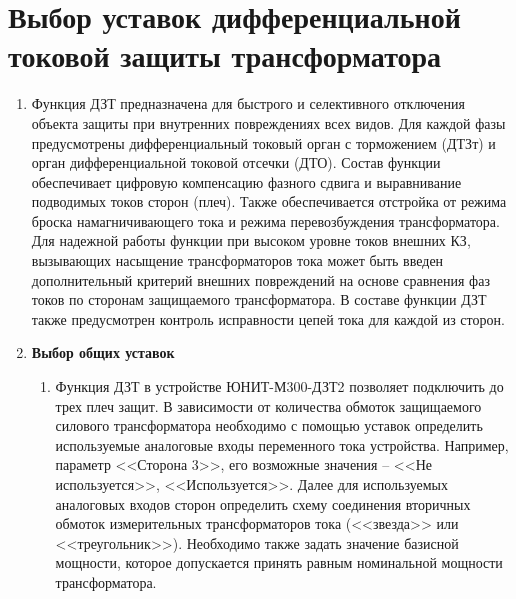 \color{uniblue}\section[Выбор уставок дифференциальной токовой защиты трансформатора]{\sloppy Выбор уставок дифференциальной токовой защиты \mbox{трансформатора}} 
\color{black}

\begin{enumerate}[label=\arabic{section}.\arabic{enumi}, labelsep=7pt, leftmargin=0pt, itemindent=60pt, align=left, nosep]
\item
Функция ДЗТ предназначена для быстрого и селективного отключения объекта защиты при внутренних повреждениях всех видов. Для каждой фазы предусмотрены дифференциальный токовый орган с торможением (ДТЗт) и орган дифференциальной токовой отсечки (ДТО). Состав функции обеспечивает цифровую компенсацию фазного сдвига и выравнивание подводимых токов сторон (плеч). Также обеспечивается отстройка от режима броска намагничивающего тока и режима перевозбуждения трансформатора. Для надежной работы функции при высоком уровне токов внешних КЗ, вызывающих насыщение трансформаторов тока может быть введен дополнительный критерий внешних повреждений на основе сравнения фаз токов по сторонам защищаемого трансформатора. В составе функции ДЗТ также предусмотрен контроль исправности цепей тока для каждой из сторон.

\item \textbf{Выбор общих уставок}

\begin{enumerate}[label=\arabic{section}.\arabic{enumi}.\arabic*, labelsep=7pt, leftmargin=0em, itemindent=55.5pt, align=left, nosep]

\item
Функция ДЗТ в устройстве ЮНИТ-М300-ДЗТ2 позволяет подключить до трех плеч защит. В зависимости от  количества обмоток защищаемого силового трансформатора необходимо с помощью уставок определить используемые аналоговые входы переменного тока устройства. Например, параметр <<Сторона 3>>, его возможные значения -- <<Не используется>>, <<Используется>>.
Далее для используемых аналоговых входов сторон определить схему соединения вторичных обмоток измерительных трансформаторов тока (<<звезда>> или <<треугольник>>).
Необходимо также задать значение базисной мощности, которое допускается принять равным номинальной мощности трансформатора.


\end{enumerate}
\end{enumerate}
